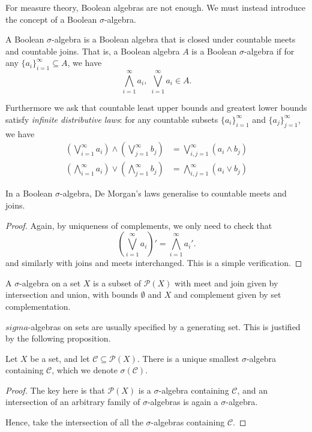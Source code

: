 \documentclass{owmaths}
\begin{document}
For measure theory, Boolean algebras are not enough. We must instead 
introduce the concept of a Boolean $\sigma$-algebra.
\begin{definition}
    A Boolean $\sigma$-algebra is a Boolean algebra that is closed
    under countable meets and countable joins. That is,
    a Boolean algebra
    $A$ is a Boolean $\sigma$-algebra if for any $\{a_i\}_{i=1}^\infty \subseteq A$, we have
    \begin{equation*}
        \bigwedge_{i=1}^\infty a_i,\;\bigvee_{i=1}^\infty a_i \in A.
    \end{equation*}
    
    Furthermore we ask that countable least upper bounds and greatest lower bounds
    satisfy \emph{infinite distributive laws}: for any countable subsets $\{a_i\}_{i=1}^\infty$
    and $\{a_j\}_{j=1}^\infty$, we have
    \begin{align*}
        \left(\bigvee_{i=1}^\infty a_i\right)\wedge\left(\bigvee_{j=1}^\infty b_j \right) &= \bigvee_{i,j=1}^\infty (a_i \wedge b_j)\\
        \left(\bigwedge_{i=1}^\infty a_i\right)\vee\left(\bigwedge_{j=1}^\infty b_j\right) &= \bigwedge_{i,j=1}^\infty (a_i \vee b_j)
    \end{align*}
\end{definition}
\begin{proposition}
    In a Boolean $\sigma$-algebra, De Morgan's laws generalise to countable meets and joins.
\end{proposition}
\begin{proof}
    Again, by uniqueness of complements, we only need to check that
    \begin{equation*}
        \left(\bigvee_{i=1}^\infty a_i\right)' = \bigwedge_{i=1}^\infty a_i'.
    \end{equation*}
    and similarly with joins and meets interchanged. This is a simple verification.
\end{proof}

\begin{definition}
    A $\sigma$-algebra on a set $X$ is a subset of $\mathcal{P}(X)$
    with meet and join given by intersection and union, with bounds $\emptyset$ and $X$ 
    and complement given by set complementation.
\end{definition}

$sigma$-algebras on sets are usually specified by a generating set. This is justified
by the following proposition.
\begin{proposition}
    Let $X$ be a set, and let $\mathcal{C} \subseteq \mathcal{P}(X)$. There
    is a unique smallest $\sigma$-algebra containing $\mathcal{C}$, which we
    denote $\sigma(\mathcal{C})$.
\end{proposition}
\begin{proof}
    The key here is that $\mathcal{P}(X)$ is a $\sigma$-algebra
    containing $\mathcal{C}$, and an intersection of an arbitrary family 
    of $\sigma$-algebras is again a $\sigma$-algebra. 
    
    Hence, take the intersection of all the $\sigma$-algebras containing $\mathcal{C}$.
\end{proof}
\end{document}
